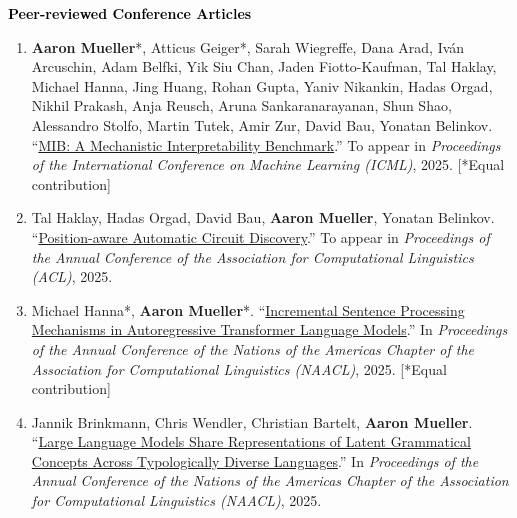 \documentclass[10pt]{article}
\renewcommand{\section}[1]{\pagebreak[3]%
	\vspace{0.5\baselineskip}%
	\phantomsection\addcontentsline{toc}{section}{#1}%
	\noindent\llap{\bf\scshape\smash{\parbox[t]{\marginparwidth}{\hyphenpenalty=10000\raggedright \textcolor{black}{#1}}}}%
	\vspace{-\baselineskip}\par}
\renewcommand{\subsection}[1]{\textcolor{black}{#1}}
\providecommand*\titlelink[2]{\href{#1}{\textcolor{accent}{#2}}}
\begin{document}
	\section{Publications}

	\subsection{\textbf{Peer-reviewed Conference Articles}}
	\begin{enumerate}[leftmargin=*, topsep=0pt, itemsep=0.25ex, partopsep=0ex, parsep=1ex, label=C\arabic*., ref=C\arabic*]

	\item \textbf{Aaron Mueller}*, Atticus Geiger*, Sarah Wiegreffe, Dana Arad, Iván Arcuschin, Adam Belfki, Yik Siu Chan, Jaden Fiotto-Kaufman, Tal Haklay, Michael Hanna, Jing Huang, Rohan Gupta, Yaniv Nikankin, Hadas Orgad, Nikhil Prakash, Anja Reusch, Aruna Sankaranarayanan, Shun Shao, Alessandro Stolfo, Martin Tutek, Amir Zur, David Bau, Yonatan Belinkov. ``\titlelink{https://arxiv.org/abs/2504.13151}{MIB: A Mechanistic Interpretability Benchmark}.'' To appear in \emph{Proceedings of the International Conference on Machine Learning (ICML)}, 2025. [*Equal contribution]\label{pub:mib}
	
	\item Tal Haklay, Hadas Orgad, David Bau, \textbf{Aaron Mueller}, Yonatan Belinkov. ``\titlelink{https://arxiv.org/abs/2502.04577}{Position-aware Automatic Circuit Discovery}.'' To appear in \emph{Proceedings of the Annual Conference of the Association for Computational Linguistics (ACL)}, 2025.\label{pub:position-circuits}
	
	\item Michael Hanna*, \textbf{Aaron Mueller}*. ``\titlelink{https://arxiv.org/abs/2412.05353}{Incremental Sentence Processing Mechanisms in Autoregressive Transformer Language Models}.'' In \emph{Proceedings of the Annual Conference of the Nations of the Americas Chapter of the Association for Computational Linguistics (NAACL)}, 2025. [*Equal contribution]\label{pub:garden-path-mech}
	
	\item Jannik Brinkmann, Chris Wendler, Christian Bartelt, \textbf{Aaron Mueller}. ``\titlelink{https://arxiv.org/abs/2501.06346}{Large Language Models Share Representations of Latent Grammatical Concepts Across Typologically Diverse Languages}.'' In \emph{Proceedings of the Annual Conference of the Nations of the Americas Chapter of the Association for Computational Linguistics (NAACL)}, 2025.\label{pub:multilingual-concepts}
	

\end{enumerate}
\end{document}
